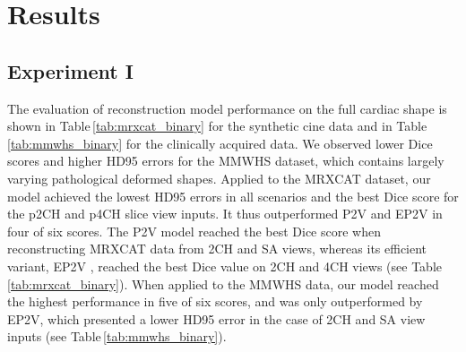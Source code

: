 \section{Results}
    \subsection{Experiment I}
     The evaluation of reconstruction model performance on the full cardiac shape is shown in Table\,\ref{tab:mrxcat_binary} for the synthetic cine data and in Table\,\ref{tab:mmwhs_binary} for the clinically acquired data. We observed lower Dice scores and higher HD95 errors for the MMWHS dataset, which contains largely varying pathological deformed shapes.
    Applied to the MRXCAT dataset, our model achieved the lowest HD95 errors in all scenarios and the best Dice score for the p2CH and p4CH slice view inputs. It thus outperformed P2V and EP2V in four of six scores.
    The P2V model \cite{xie2019pix2vox} reached the best Dice score when reconstructing MRXCAT data from 2CH and SA views, whereas its efficient variant, EP2V \cite{stojanovski2022efficient}, reached the best Dice value on 2CH and 4CH views (see Table\,\ref{tab:mrxcat_binary}).
    When applied to the MMWHS data, our model reached the highest performance in five of six scores,
    and was only outperformed by EP2V, which presented a lower HD95 error in the case of 2CH and SA view inputs (see Table\,\ref{tab:mmwhs_binary}).
